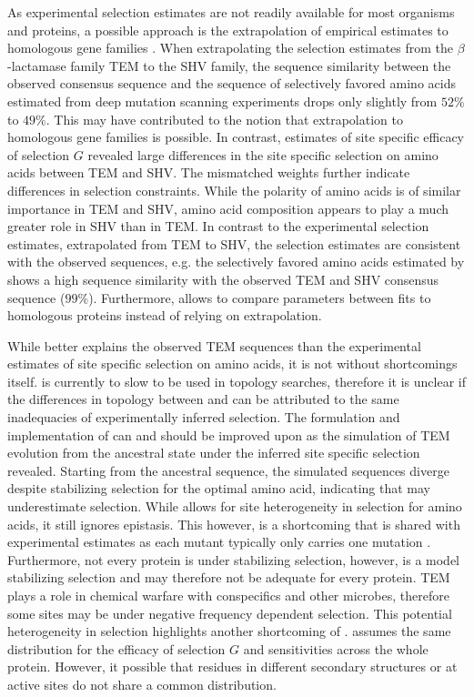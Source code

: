 As experimental selection estimates are not readily available for most organisms and proteins, a possible approach is the extrapolation of empirical estimates to homologous gene families \citep{bloom2014, bloom2017}.
When extrapolating the selection estimates from the $\beta$-lactamase family TEM to the SHV family, the sequence similarity between the observed consensus sequence and the sequence of selectively favored amino acids estimated from deep mutation scanning experiments drops only slightly from $52 \% $ to $49 \%$.
This may have contributed to the notion that extrapolation to homologous gene families is possible.
In contrast, estimates of site specific efficacy of selection $G$ revealed large differences in the site specific selection on amino acids between TEM and SHV.
The mismatched \PC weights further indicate differences in selection constraints. 
While the polarity of amino acids is of similar importance in TEM and SHV, amino acid composition appears to play a much greater role in SHV than in TEM.
In contrast to the experimental selection estimates, extrapolated from TEM to SHV, the \selac selection estimates are consistent with the observed sequences, e.g. the selectively favored amino acids estimated by \selac shows a high sequence similarity with the observed TEM and SHV consensus sequence ($99 \%$).
Furthermore, \selac allows to compare parameters between fits to homologous proteins instead of relying on extrapolation.

While \selac better explains the observed TEM sequences than the experimental estimates of site specific selection on amino acids, it is not without shortcomings itself.
\selac is currently to slow to be used in topology searches, therefore it is unclear if the differences in topology between \phydms and \selac can be attributed to the same inadequacies of experimentally inferred selection.
The formulation and implementation of \selac can and should be improved upon as the simulation of TEM evolution from the ancestral state under the \selac inferred site specific selection revealed.
Starting from the ancestral sequence, the simulated sequences diverge despite stabilizing selection for the optimal amino acid, indicating that \selac may underestimate selection.
While \selac allows for site heterogeneity in selection for amino acids, it still ignores epistasis.
This however, is a shortcoming that is shared with experimental estimates as each mutant typically only carries one mutation \citep{FirnbergAndOstermeier2012, Jain2014}.
Furthermore, not every protein is under stabilizing selection, however, \selac is a model stabilizing selection and may therefore not be adequate for every protein.
TEM plays a role in chemical warfare with conspecifics and other microbes, therefore some sites may be under negative frequency dependent selection.
This potential heterogeneity in selection highlights another shortcoming of \selac.
\selac assumes the same distribution for the efficacy of selection $G$ and \PC sensitivities across the whole protein.
However, it possible that residues in different secondary structures or at active sites do not share a common distribution.

